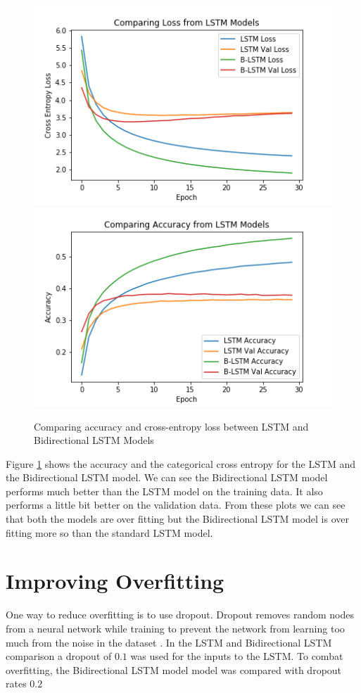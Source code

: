 \documentclass[11pt,a4paper]{article}
\begin{document}
\begin{figure}[h!]
\centering
\includegraphics[scale=0.5]{blstm_compare_loss.png}
\includegraphics[scale=0.5]{blstm_compare_acc.png}
\caption{Comparing accuracy and cross-entropy loss between LSTM and Bidirectional LSTM Models}
\label{fig:lstm_compare_loss}
\end{figure}

Figure \ref{fig:lstm_compare_loss} shows the accuracy and the categorical cross entropy for the LSTM and the Bidirectional LSTM model.
We can see the Bidirectional LSTM model performs much better than the LSTM model on the training data.
It also performs a little bit better on the validation data.
From these plots we can see that both the models are over fitting but the Bidirectional LSTM model is over fitting more so than the standard LSTM model.

\section{Improving Overfitting}
One way to reduce overfitting is to use dropout.
Dropout removes random nodes from a neural network while training to prevent the network from learning too much from the noise in the dataset \cite{dropout_srivastava}.
In the LSTM and Bidirectional LSTM comparison a dropout of $0.1$ was used for the inputs to the LSTM.
To combat overfitting, the Bidirectional LSTM model model was compared with dropout rates $0.2$
\end{document}
